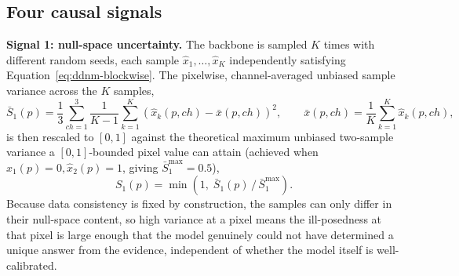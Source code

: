 \documentclass[review]{elsarticle}
\begin{document}
\begin{algorithm}[h]
\SetAlgoLined
{}
\caption{Chained, DDNM-projected 16$\times$ sampling}
\label{alg:sampling}
\end{algorithm}

\subsection{Four causal signals}
\label{sec:signals}

\textbf{Signal 1: null-space uncertainty.} The backbone is sampled $K$ times with different random seeds, each sample $\hat{x}_1, \dots, \hat{x}_K$ independently satisfying Equation~\ref{eq:ddnm-blockwise}. The pixelwise, channel-averaged unbiased sample variance across the $K$ samples,
\begin{equation}
\bar{S}_1(p) = \frac{1}{3}\sum_{ch=1}^{3} \frac{1}{K-1}\sum_{k=1}^{K} \left(\hat{x}_k(p, ch) - \bar{x}(p, ch)\right)^2, \qquad \bar{x}(p, ch) = \frac{1}{K}\sum_{k=1}^{K}\hat{x}_k(p, ch),
\label{eq:s1-raw}
\end{equation}
is then rescaled to $[0,1]$ against the theoretical maximum unbiased two-sample variance a $[0,1]$-bounded pixel value can attain (achieved when $\hat{x}_1(p)=0, \hat{x}_2(p)=1$, giving $\bar{S}_1^{\max}=0.5$),
\begin{equation}
S_1(p) = \min\!\left(1, \; \bar{S}_1(p) \,/\, \bar{S}_1^{\max}\right).
\label{eq:s1}
\end{equation}
Because data consistency is fixed by construction, the samples can only differ in their null-space content, so high variance at a pixel means the ill-posedness at that pixel is large enough that the model genuinely could not have determined a unique answer from the evidence, independent of whether the model itself is well-calibrated.
\end{document}

